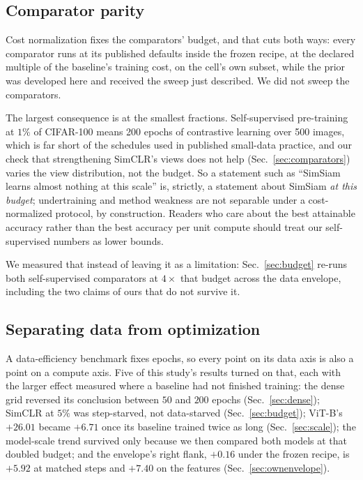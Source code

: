 \subsection{Comparator parity}\label{sec:parity}
Cost normalization fixes the comparators' budget, and that cuts both ways:
every comparator runs at its published defaults inside the frozen recipe, at
the declared multiple of the baseline's training cost, on the cell's own
subset, while the prior was developed here and received the sweep just
described. We did not sweep the comparators.

The largest consequence is at the smallest fractions. Self-supervised
pre-training at $1\%$ of CIFAR-100 means 200 epochs of contrastive learning
over 500 images, which is far short of the schedules used in published
small-data practice, and our check that strengthening SimCLR's views does not
help (Sec.~\ref{sec:comparators}) varies the view distribution, not the
budget. So a statement such as ``SimSiam learns almost nothing at this scale''
is, strictly, a statement about SimSiam \emph{at this budget}; undertraining
and method weakness are not separable under a cost-normalized protocol, by
construction. Readers who care about the best attainable accuracy rather than
the best accuracy per unit compute should treat our self-supervised numbers as
lower bounds.

We measured that instead of leaving it as a limitation:
Sec.~\ref{sec:budget} re-runs both self-supervised comparators at $4\times$
that budget across the data envelope, including the two claims of ours that do
not survive it.

\subsection{Separating data from optimization}\label{sec:dataopt}
 A data-efficiency benchmark fixes epochs, so every point on its
data axis is also a point on a compute axis. Five of this study's results
turned on that, each with the larger effect measured where a baseline had not
finished training: the dense grid reversed its conclusion between $50$ and
$200$ epochs (Sec.~\ref{sec:dense}); SimCLR at $5\%$ was step-starved, not
data-starved (Sec.~\ref{sec:budget}); ViT-B's $+26.01$ became $+6.71$ once
its baseline trained twice as long (Sec.~\ref{sec:scale}); the model-scale
trend survived only because we then compared both models at that doubled
budget; and the
envelope's right flank, $+0.16$ under the frozen recipe, is $+5.92$ at matched
steps and $+7.40$ on the features (Sec.~\ref{sec:ownenvelope}).

